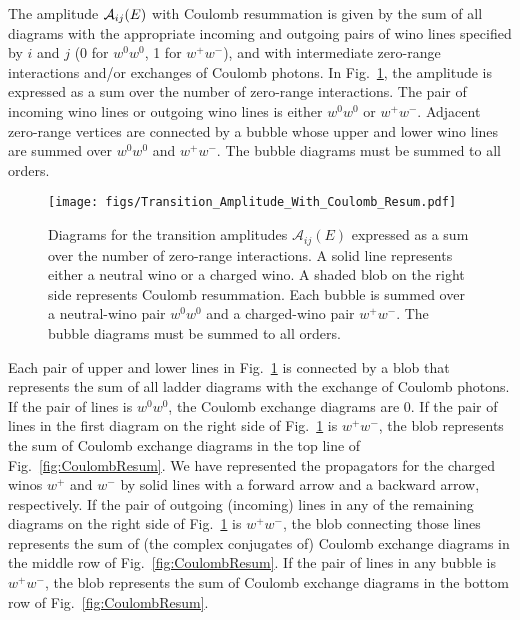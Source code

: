 \documentclass[%
 reprint,
 amsmath,amssymb,
 aps,
]{revtex4-1}
\begin{document}
The amplitude ${\cal A}_{ij}(E)$ with Coulomb resummation is given by the sum of all diagrams with the appropriate incoming and outgoing pairs of wino lines specified by $i$ and $j$ (0 for $w^0w^0$, 1 for $w^+w^-$), and with intermediate zero-range interactions and/or exchanges of Coulomb photons. 
In Fig.~\ref{fig:ZREFTSumC}, the amplitude is expressed as a sum over the number of zero-range interactions.
The pair of incoming wino lines or outgoing wino lines is either $w^0w^0$ or $w^+ w^-$.
Adjacent zero-range vertices are connected by a bubble whose upper and lower wino lines are summed over $w^0 w^0$ and $w^+ w^-$.
The bubble diagrams must be summed to all orders.

\begin{figure}[t]
\centering
\texttt{[image: figs/Transition\_Amplitude\_With\_Coulomb\_Resum.pdf]}
\caption{Diagrams for the transition amplitudes $\mathcal{A}_{ij}(E)$ expressed as a sum over the number of zero-range interactions. 
A solid line represents either a neutral wino or a charged wino.
A shaded blob on the right side represents Coulomb resummation.
Each bubble is summed over a neutral-wino pair $w^0 w^0$ and a charged-wino pair $w^+ w^-$.
The bubble diagrams must be summed to all orders.
}
\label{fig:ZREFTSumC}
\end{figure}

Each pair of upper and lower lines in Fig.~\ref{fig:ZREFTSumC} is connected by a blob that represents the sum of all ladder diagrams with the exchange of Coulomb photons.
If the pair of lines is $w^0w^0$, the Coulomb exchange diagrams are 0.
If the pair of lines  in the first diagram on the right side of Fig.~\ref{fig:ZREFTSumC} is $w^+w^-$, the blob represents the sum of Coulomb exchange diagrams in the top line of Fig.~\ref{fig:CoulombResum}.
We have represented the propagators for the charged winos $w^+$ and $w^-$ by solid lines with a forward arrow and a backward arrow, respectively.  
If the pair of outgoing (incoming) lines in any of the remaining diagrams on the right side of Fig.~\ref{fig:ZREFTSumC} is $w^+w^-$, the blob connecting those lines represents the sum of (the complex conjugates of) Coulomb exchange diagrams in the middle row of Fig.~\ref{fig:CoulombResum}.
If the pair of lines  in any bubble is $w^+w^-$, the blob represents the sum of Coulomb exchange diagrams in the bottom row of Fig.~\ref{fig:CoulombResum}.
\end{document}
